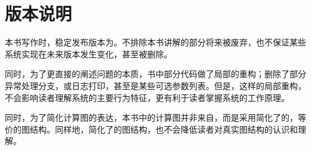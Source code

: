 \section*{版本说明}

\begin{content}

本书写作时，稳定发布版本为。不排除本书讲解的部分将来被废弃，也不保证某些系统实现在未来版本发生变化，甚至被删除。

同时，为了更直接的阐述问题的本质，书中部分代码做了局部的重构；删除了部分异常处理分支，或日志打印，甚至是某些可选参数列表。但是，这样的局部重构，不会影响读者理解系统的主要行为特征，更有利于读者掌握系统的工作原理。

同时，为了简化计算图的表达，本书中的计算图并非来自，而是采用简化了的，等价的图结构。同样地，简化了的图结构，也不会降低读者对真实图结构的认识和理解。

\end{content}








